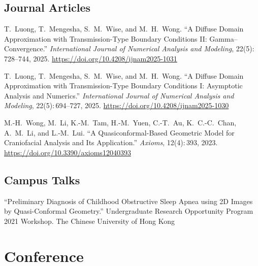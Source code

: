 \documentclass[11pt,letterpaper]{report}
\begin{document}
\subsection*{Journal Articles}

\begin{tablist}
    \item[2025] \tab{}T.\ Luong, T.\ Mengesha, S.\ M.\ Wise, and M.\ H.\ Wong.
    \enquote{A Diffuse Domain Approximation with Transmission-Type Boundary Conditions II: Gamma--Convergence.}
    \textit{International Journal of Numerical Analysis and Modeling}, 22(5):\,728--744, 2025.
    \url{https://doi.org/10.4208/ijnam2025-1031}

    \item[2025] \tab{}T.\ Luong, T.\ Mengesha, S.\ M.\ Wise, and M.\ H.\ Wong.
    \enquote{A Diffuse Domain Approximation with Transmission-Type Boundary Conditions I: Asymptotic Analysis and Numerics.}
    \textit{International Journal of Numerical Analysis and Modeling}, 22(5):\,694--727, 2025.
    \url{https://doi.org/10.4208/ijnam2025-1030}

    \item[2023] \tab{}M.-H.\ Wong, M.\ Li, K.-M.\ Tam, H.-M.\ Yuen, C.-T.\ Au, K.\ C.-C.\ Chan, A.\ M.\ Li, and L.-M.\ Lui.
    \enquote{A Quasiconformal-Based Geometric Model for Craniofacial Analysis and Its Application.}
    \textit{Axioms}, 12(4):\,393, 2023.
    \url{https://doi.org/10.3390/axioms12040393}
\end{tablist}


    \subsection*{Campus Talks}

    \begin{tablist}


        \item[2022] \tab{}\enquote{Preliminary Diagnosis of Childhood Obstructive Sleep Apnea using 2D Images by Quasi-Conformal Geometry.} Undergraduate Research Opportunity Program 2021 Workshop. The Chinese University of Hong Kong



    \end{tablist}

    \section*{Conference}
\end{document}
